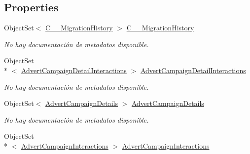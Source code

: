 \subsection*{Properties}
\begin{DoxyCompactItemize}
\item 
Object\-Set$<$ \hyperlink{class_microsoft_1_1_samples_1_1_kinect_1_1_basic_interactions_1_1_c_____migration_history}{C\-\_\-\-\_\-\-Migration\-History} $>$ \hyperlink{class_microsoft_1_1_samples_1_1_kinect_1_1_basic_interactions_1_1_o_m_k_t_d_b_entities_aa4f5d302445bb3451b74c01668879be4}{C\-\_\-\-\_\-\-Migration\-History}
\begin{DoxyCompactList}\small\item\em No hay documentación de metadatos disponible. \end{DoxyCompactList}\item 
Object\-Set\\*
$<$ \hyperlink{class_microsoft_1_1_samples_1_1_kinect_1_1_basic_interactions_1_1_advert_campaign_detail_interactions}{Advert\-Campaign\-Detail\-Interactions} $>$ \hyperlink{class_microsoft_1_1_samples_1_1_kinect_1_1_basic_interactions_1_1_o_m_k_t_d_b_entities_abad6d6824de7bf15745aec0aab357814}{Advert\-Campaign\-Detail\-Interactions}
\begin{DoxyCompactList}\small\item\em No hay documentación de metadatos disponible. \end{DoxyCompactList}\item 
Object\-Set$<$ \hyperlink{class_microsoft_1_1_samples_1_1_kinect_1_1_basic_interactions_1_1_advert_campaign_details}{Advert\-Campaign\-Details} $>$ \hyperlink{class_microsoft_1_1_samples_1_1_kinect_1_1_basic_interactions_1_1_o_m_k_t_d_b_entities_aaa0a59fada97a29b9f5d81fa6bf42f97}{Advert\-Campaign\-Details}
\begin{DoxyCompactList}\small\item\em No hay documentación de metadatos disponible. \end{DoxyCompactList}\item 
Object\-Set\\*
$<$ \hyperlink{class_microsoft_1_1_samples_1_1_kinect_1_1_basic_interactions_1_1_advert_campaign_interactions}{Advert\-Campaign\-Interactions} $>$ \hyperlink{class_microsoft_1_1_samples_1_1_kinect_1_1_basic_interactions_1_1_o_m_k_t_d_b_entities_a92cd3872107852d7e4acd71cd6c50c96}{Advert\-Campaign\-Interactions}

\end{DoxyCompactItemize}
